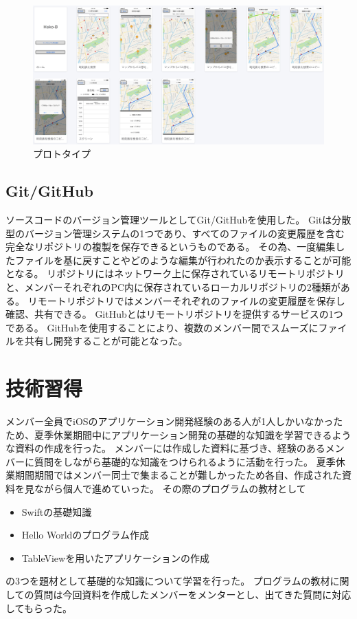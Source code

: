 \documentclass[openany,11pt,papersize]{jsbook}
\begin{document}
\begin{figure}[htbp]
  \begin{center}
    \includegraphics[clip,width=\hsize]{img/prott.png}
    \caption{プロトタイプ}
    \label{fig:prott}
  \end{center}
\end{figure}


\subsection{Git/GitHub}
ソースコードのバージョン管理ツールとしてGit/GitHubを使用した。
Gitは分散型のバージョン管理システムの1つであり、すべてのファイルの変更履歴を含む完全なリポジトリの複製を保存できるというものである。
その為、一度編集したファイルを基に戻すことやどのような編集が行われたのか表示することが可能となる。
リポジトリにはネットワーク上に保存されているリモートリポジトリと、メンバーそれぞれのPC内に保存されているローカルリポジトリの2種類がある\cite{b}。
リモートリポジトリではメンバーそれぞれのファイルの変更履歴を保存し確認、共有できる。
GitHubとはリモートリポジトリを提供するサービスの1つである。
GitHubを使用することにより、複数のメンバー間でスムーズにファイルを共有し開発することが可能となった。


\section{技術習得}
メンバー全員でiOSのアプリケーション開発経験のある人が1人しかいなかったため、夏季休業期間中にアプリケーション開発の基礎的な知識を学習できるような資料の作成を行った。
メンバーには作成した資料に基づき、経験のあるメンバーに質問をしながら基礎的な知識をつけられるように活動を行った。
夏季休業期間期間ではメンバー同士で集まることが難しかったため各自、作成された資料を見ながら個人で進めていった。
その際のプログラムの教材として
\begin{itemize}

\item Swiftの基礎知識
\item Hello Worldのプログラム作成
\item TableViewを用いたアプリケーションの作成

\end{itemize}
の3つを題材として基礎的な知識について学習を行った。
プログラムの教材に関しての質問は今回資料を作成したメンバーをメンターとし、出てきた質問に対応してもらった。
\end{document}
